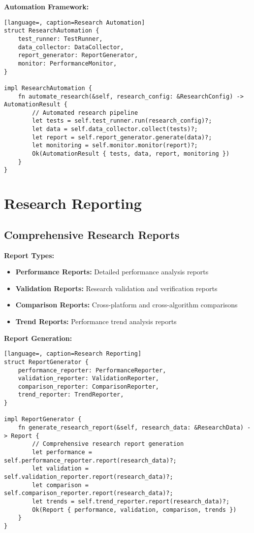 \documentclass[12pt,a4paper]{article}
\begin{document}
\textbf{Automation Framework:}
\begin{lstlisting}[language=, caption=Research Automation]
struct ResearchAutomation {
    test_runner: TestRunner,
    data_collector: DataCollector,
    report_generator: ReportGenerator,
    monitor: PerformanceMonitor,
}

impl ResearchAutomation {
    fn automate_research(&self, research_config: &ResearchConfig) -> AutomationResult {
        // Automated research pipeline
        let tests = self.test_runner.run(research_config)?;
        let data = self.data_collector.collect(tests)?;
        let report = self.report_generator.generate(data)?;
        let monitoring = self.monitor.monitor(report)?;
        Ok(AutomationResult { tests, data, report, monitoring })
    }
}
\end{lstlisting}

\section{Research Reporting}

\subsection{Comprehensive Research Reports}

\textbf{Report Types:}
\begin{itemize}
    \item \textbf{Performance Reports:} Detailed performance analysis reports
    \item \textbf{Validation Reports:} Research validation and verification reports
    \item \textbf{Comparison Reports:} Cross-platform and cross-algorithm comparisons
    \item \textbf{Trend Reports:} Performance trend analysis reports
\end{itemize}

\textbf{Report Generation:}
\begin{lstlisting}[language=, caption=Research Reporting]
struct ReportGenerator {
    performance_reporter: PerformanceReporter,
    validation_reporter: ValidationReporter,
    comparison_reporter: ComparisonReporter,
    trend_reporter: TrendReporter,
}

impl ReportGenerator {
    fn generate_research_report(&self, research_data: &ResearchData) -> Report {
        // Comprehensive research report generation
        let performance = self.performance_reporter.report(research_data)?;
        let validation = self.validation_reporter.report(research_data)?;
        let comparison = self.comparison_reporter.report(research_data)?;
        let trends = self.trend_reporter.report(research_data)?;
        Ok(Report { performance, validation, comparison, trends })
    }
}
\end{lstlisting}
\end{document}
